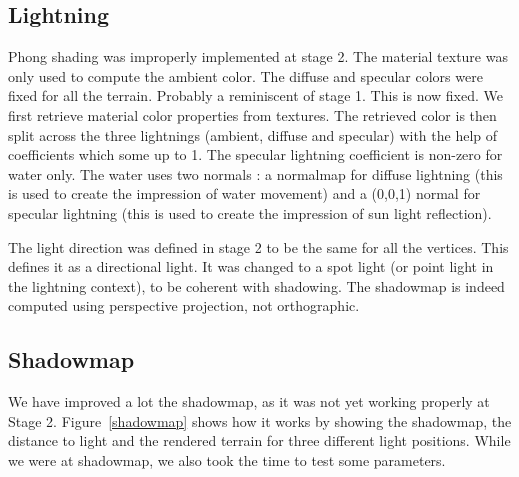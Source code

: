 \documentclass[a4paper,11pt]{article}
\begin{document}
\subsection{Lightning}

Phong shading was improperly implemented at stage 2. The material texture was only used to compute the ambient color. The diffuse and specular colors were fixed for all the terrain. Probably a reminiscent of stage 1. This is now fixed. We first retrieve material color properties from textures. The retrieved color is then split across the three lightnings (ambient, diffuse and specular) with the help of coefficients which some up to 1. The specular lightning coefficient is non-zero for water only. The water uses two normals : a normalmap for diffuse lightning (this is used to create the impression of water movement) and a (0,0,1) normal for specular lightning (this is used to create the impression of sun light reflection).

The light direction was defined in stage 2 to be the same for all the vertices. This defines it as a directional light. It was changed to a spot light (or point light in the lightning context), to be coherent with shadowing. The shadowmap is indeed computed using perspective projection, not orthographic.

\subsection{Shadowmap}

We have improved a lot the shadowmap, as it was not yet working properly at Stage 2. Figure~\ref{shadowmap} shows how it works by showing the shadowmap, the distance to light and the rendered terrain for three different light positions. While we were at shadowmap, we also took the time to test some parameters.
\end{document}
